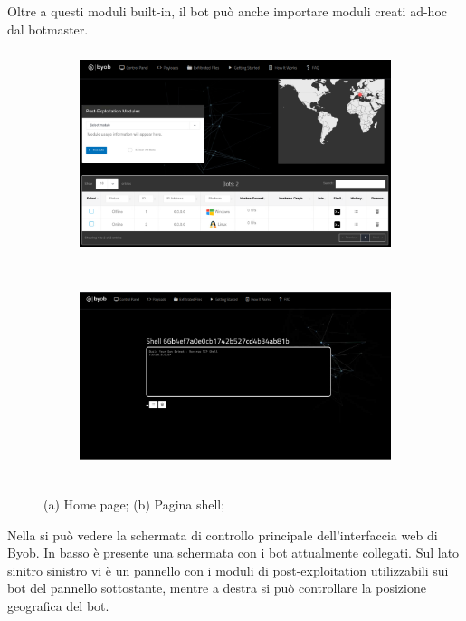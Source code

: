 Oltre a questi moduli built-in, il bot può anche importare moduli creati ad-hoc dal botmaster.




\begin{figure}[hbtp]
    \centering
    \begin{subfigure}[hbtp]{0.45\textwidth}
        \centering
        \includegraphics[width=\textwidth, height=6cm]{res/fig/byob-home.png}
        \caption{}
        \label{fig:byobhome}
    \end{subfigure}
    \hfill
    \begin{subfigure}[hbtp]{0.45\textwidth}
        \centering
        \includegraphics[width=\textwidth , height=6cm]{res/fig/byob-shell.png}
        \caption{}
        \label{fig:byobshell}
    \end{subfigure}
    \caption{(a) Home page; (b) Pagina shell;}
    \label{ciao1}
\end{figure}

Nella   si può vedere la schermata di controllo principale dell'interfaccia web di Byob. In basso è presente una schermata con i bot attualmente collegati. Sul lato sinitro sinistro vi è  un pannello con i moduli di post-exploitation utilizzabili sui bot del pannello sottostante, mentre a destra si può controllare la posizione geografica del bot. 

